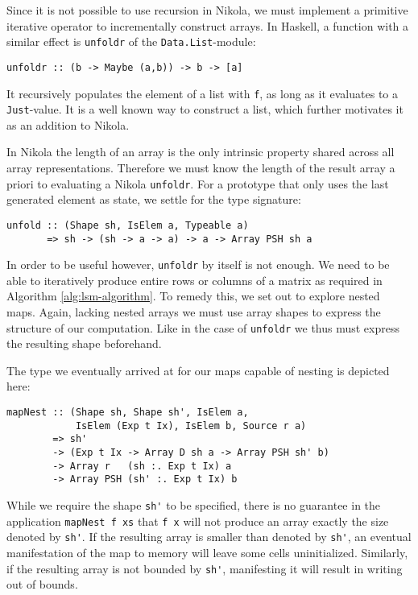 Since it is not possible to use recursion in Nikola, we must implement
a primitive iterative operator to incrementally construct arrays. In
Haskell, a function with a similar effect is \lstinline{unfoldr} of
the \lstinline{Data.List}-module:
\begin{lstlisting}
unfoldr :: (b -> Maybe (a,b)) -> b -> [a]
\end{lstlisting}
It recursively populates the element of a list with \lstinline{f}, as
long as it evaluates to a \lstinline{Just}-value. It is a well known
way to construct a list, which further motivates it as an addition to
Nikola.

In Nikola the length of an array is the only intrinsic property shared
across all array representations. Therefore we must know the length of
the result array a priori to evaluating a Nikola
\lstinline{unfoldr}. For a prototype that only uses the last generated
element as state, we settle for the type signature:
\begin{lstlisting}
unfold :: (Shape sh, IsElem a, Typeable a) 
       => sh -> (sh -> a -> a) -> a -> Array PSH sh a
\end{lstlisting}
In order to be useful however, \lstinline{unfoldr} by itself is not
enough. We need to be able to iteratively produce entire rows or
columns of a matrix as required in Algorithm
\ref{alg:lsm-algorithm}. To remedy this, we set out to explore nested
maps. Again, lacking nested arrays we must use array shapes to express
the structure of our computation.  Like in the case of
\lstinline{unfoldr} we thus must express the resulting shape
beforehand.

The type we eventually arrived at for our maps capable of nesting is depicted
here:
\begin{lstlisting}
mapNest :: (Shape sh, Shape sh', IsElem a, 
            IsElem (Exp t Ix), IsElem b, Source r a)
        => sh'
        -> (Exp t Ix -> Array D sh a -> Array PSH sh' b)
        -> Array r   (sh :. Exp t Ix) a
        -> Array PSH (sh' :. Exp t Ix) b
\end{lstlisting}

While we require the shape \lstinline{sh'} to be specified, there is no guarantee
in the application \lstinline{mapNest f xs} that \lstinline{f x} will not produce an
array exactly the size denoted by \lstinline{sh'}. If the resulting array is
smaller than denoted by \lstinline{sh'}, an eventual manifestation of the map to
memory will leave some cells uninitialized. Similarly, if the resulting array
is not bounded by \lstinline{sh'}, manifesting it will result in writing out of
bounds.

